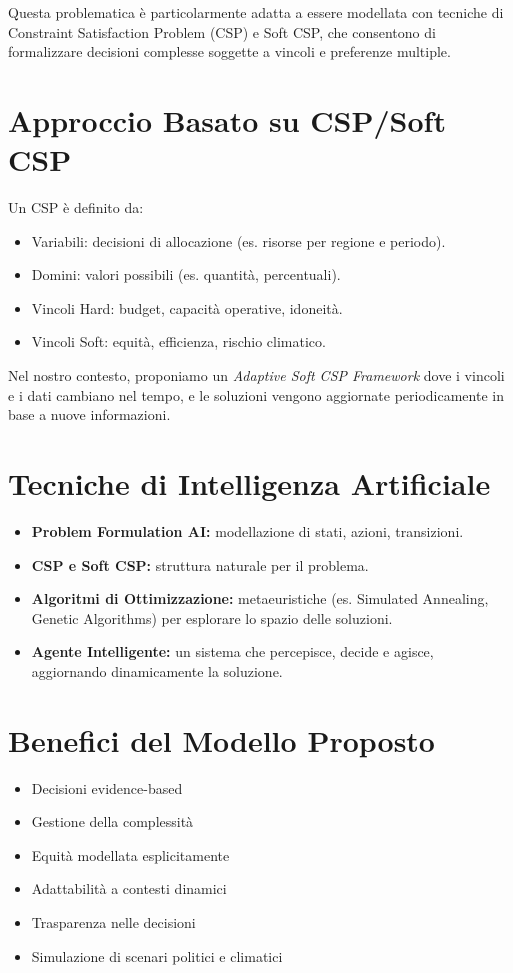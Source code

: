 \documentclass[11pt]{article}
\begin{document}
Questa problematica è particolarmente adatta a essere modellata con tecniche di Constraint Satisfaction Problem (CSP) e Soft CSP, che consentono di formalizzare decisioni complesse soggette a vincoli e preferenze multiple.

\section{Approccio Basato su CSP/Soft CSP}
Un CSP è definito da:
\begin{itemize}
\item Variabili: decisioni di allocazione (es. risorse per regione e periodo).
\item Domini: valori possibili (es. quantità, percentuali).
\item Vincoli Hard: budget, capacità operative, idoneità.
\item Vincoli Soft: equità, efficienza, rischio climatico.
\end{itemize}

Nel nostro contesto, proponiamo un \textit{Adaptive Soft CSP Framework} dove i vincoli e i dati cambiano nel tempo, e le soluzioni vengono aggiornate periodicamente in base a nuove informazioni.

\section{Tecniche di Intelligenza Artificiale}
\begin{itemize}
\item \textbf{Problem Formulation AI:} modellazione di stati, azioni, transizioni.
\item \textbf{CSP e Soft CSP:} struttura naturale per il problema.
\item \textbf{Algoritmi di Ottimizzazione:} metaeuristiche (es. Simulated Annealing, Genetic Algorithms) per esplorare lo spazio delle soluzioni.
\item \textbf{Agente Intelligente:} un sistema che percepisce, decide e agisce, aggiornando dinamicamente la soluzione.
\end{itemize}

\section{Benefici del Modello Proposto}
\begin{itemize}
\item Decisioni evidence-based
\item Gestione della complessità
\item Equità modellata esplicitamente
\item Adattabilità a contesti dinamici
\item Trasparenza nelle decisioni
\item Simulazione di scenari politici e climatici
\end{itemize}
\end{document}
